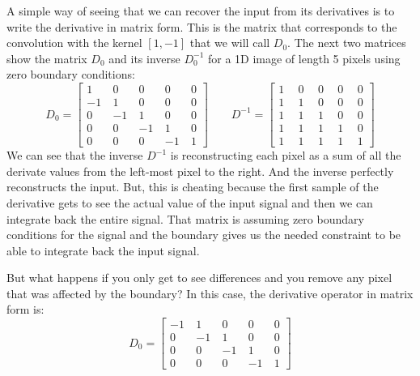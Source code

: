 A simple way of seeing that we can recover the input from its derivatives is to write the derivative in matrix form. This is the matrix that corresponds to the convolution with the kernel $\left[1, -1 \right]$ that we will call $D_0$. The next two matrices show the matrix $D_0$ and its inverse $D_0^{-1}$ for a 1D image of length 5 pixels using zero boundary conditions:
\begin{equation}
	D_0 =
	\begin{bmatrix}
		1 ~  & 0 ~  & 0 ~  & 0~   & 0 \\
		-1 ~ & 1 ~  & 0 ~  & 0~   & 0 \\
		0 ~  & -1 ~ & 1 ~  & 0 ~  & 0 \\
		0~   & 0 ~  & -1 ~ & 1 ~  & 0 \\
		0~   & 0 ~  & 0 ~  & -1 ~ & 1
	\end{bmatrix}
	~~~~~~~~~
	D^{-1} =
	\begin{bmatrix}
		1 ~ & ~ 0 ~ & ~ 0 ~ & ~ 0~  & ~ 0 \\
		1 ~ & ~ 1 ~ & ~ 0 ~ & ~ 0~  & ~ 0 \\
		1 ~ & ~ 1 ~ & ~ 1 ~ & ~ 0 ~ & ~ 0 \\
		1~  & ~ 1 ~ & ~ 1 ~ & ~ 1 ~ & ~ 0 \\
		1~  & ~ 1 ~ & ~ 1 ~ & ~ 1 ~ & ~ 1
	\end{bmatrix}
\end{equation}
We can see that the inverse $D^{-1}$ is reconstructing each pixel as a sum of all the derivate values from the left-most pixel to the right.  And the inverse perfectly reconstructs the input. But, this is cheating because the first sample of the derivative gets to see the actual value of the input signal and then we can integrate back the entire signal. That matrix is assuming zero boundary conditions for the signal and the boundary gives us the needed constraint to be able to integrate back the input signal.

But what happens if you only get to see differences and you remove any pixel that was affected by the boundary? In this case, the derivative operator in matrix form is:
\begin{equation}
	D_0 =
	\begin{bmatrix}
		-1 ~ & 1 ~  & 0 ~  & 0~   & 0 \\
		0 ~  & -1 ~ & 1 ~  & 0 ~  & 0 \\
		0~   & 0 ~  & -1 ~ & 1 ~  & 0 \\
		0~   & 0 ~  & 0 ~  & -1 ~ & 1
	\end{bmatrix}
\end{equation}


